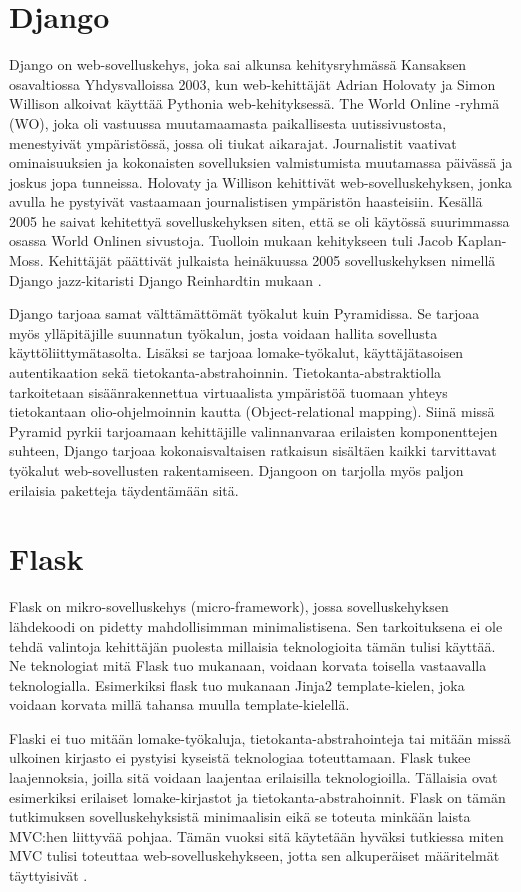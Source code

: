 \documentclass[utf8]{gradu3}
\begin{document}
\section{Django}
Django on web-sovelluskehys, joka  sai alkunsa kehitysryhmässä Kansaksen osavaltiossa Yhdysvalloissa 2003, kun web-kehittäjät Adrian Holovaty ja Simon Willison alkoivat käyttää Pythonia web-kehityksessä. The World Online -ryhmä (WO), joka oli vastuussa muutamaamasta paikallisesta uutissivustosta, menestyivät ympäristössä, jossa oli tiukat aikarajat. Journalistit vaativat ominaisuuksien ja kokonaisten sovelluksien valmistumista muutamassa päivässä ja joskus jopa tunneissa. Holovaty ja Willison kehittivät web-sovelluskehyksen, jonka avulla he pystyivät vastaamaan journalistisen ympäristön haasteisiin. Kesällä 2005 he saivat kehitettyä sovelluskehyksen siten, että se oli käytössä suurimmassa osassa World Onlinen sivustoja. Tuolloin mukaan kehitykseen tuli Jacob Kaplan-Moss. Kehittäjät päättivät julkaista heinäkuussa 2005 sovelluskehyksen nimellä Django jazz-kitaristi Django Reinhardtin mukaan \parencite{django_history}.

Django tarjoaa samat välttämättömät työkalut kuin Pyramidissa. Se tarjoaa myös ylläpitäjille suunnatun työkalun, josta voidaan hallita sovellusta käyttöliittymätasolta. Lisäksi se tarjoaa lomake-työkalut, käyttäjätasoisen autentikaation sekä tietokanta-abstrahoinnin. Tietokanta-abstraktiolla tarkoitetaan sisäänrakennettua virtuaalista ympäristöä tuomaan yhteys tietokantaan olio-ohjelmoinnin kautta (Object-relational mapping)\parencite{djangobook}. Siinä missä Pyramid pyrkii tarjoamaan kehittäjille valinnanvaraa erilaisten komponenttejen suhteen, Django tarjoaa kokonaisvaltaisen ratkaisun sisältäen kaikki tarvittavat työkalut web-sovellusten rakentamiseen. Djangoon on tarjolla myös paljon erilaisia paketteja täydentämään sitä. 

\section{Flask}
Flask on mikro-sovelluskehys (micro-framework), jossa sovelluskehyksen lähdekoodi on pidetty mahdollisimman minimalistisena. Sen tarkoituksena ei ole tehdä valintoja kehittäjän puolesta millaisia teknologioita tämän tulisi käyttää. Ne teknologiat mitä Flask tuo mukanaan, voidaan korvata toisella vastaavalla teknologialla. Esimerkiksi flask tuo mukanaan Jinja2 template-kielen, joka voidaan korvata millä tahansa muulla template-kielellä.

Flaski ei tuo mitään lomake-työkaluja, tietokanta-abstrahointeja tai mitään missä ulkoinen kirjasto ei pystyisi kyseistä teknologiaa toteuttamaan. Flask tukee laajennoksia, joilla sitä voidaan laajentaa erilaisilla teknologioilla. Tällaisia ovat esimerkiksi erilaiset lomake-kirjastot ja tietokanta-abstrahoinnit. Flask on tämän tutkimuksen sovelluskehyksistä minimaalisin eikä se toteuta minkään laista MVC:hen liittyvää pohjaa. Tämän vuoksi sitä käytetään hyväksi tutkiessa miten MVC tulisi toteuttaa web-sovelluskehykseen, jotta sen alkuperäiset määritelmät täyttyisivät \parencite{flask}.
\end{document}
